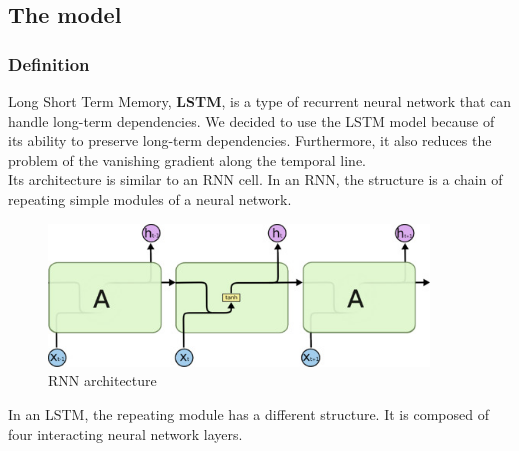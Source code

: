\subsection{The model}
\subsubsection{Definition}
Long Short Term Memory, \textbf{LSTM}, is a type of recurrent neural network that can handle long-term dependencies. We decided to use the LSTM model because of its ability to preserve long-term dependencies. Furthermore, it also reduces the problem of the vanishing gradient along the temporal line. \\ Its architecture is similar to an RNN cell. In an RNN, the structure is a chain of repeating simple modules of a neural network.

\begin{figure}[H]
    \centering
    \includegraphics[width=0.9\textwidth]{LSTM immagini/RNN.jpg}
    \caption{RNN architecture}
\end{figure}

In an LSTM, the repeating module has a different structure. It is composed of four interacting neural network layers.

